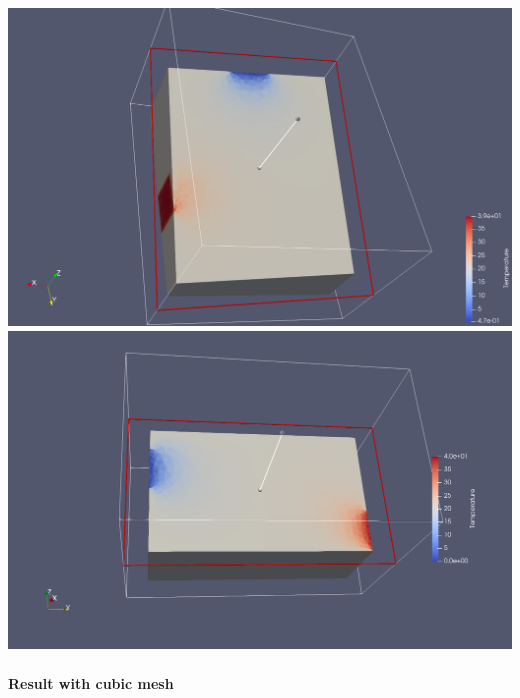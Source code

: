 \documentclass[11pt]{article}
\makeatletter
\def\maxwidth{\ifdim\Gin@nat@width>\linewidth\linewidth
    \else\Gin@nat@width\fi}
\let\Oldincludegraphics\includegraphics
\renewcommand{\includegraphics}[1]{\Oldincludegraphics[width=.8\maxwidth]{#1}}
\makeatother
\begin{document}
\includegraphics{ClipDroitTetra.png} \textbar{}
\includegraphics{ClipDevantTetra.png}

\hypertarget{result-with-cubic-mesh}{%
\paragraph{Result with cubic mesh}\label{result-with-cubic-mesh}}
\end{document}
